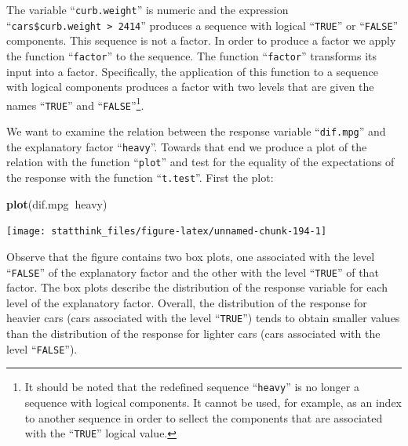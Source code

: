 \documentclass[]{krantz}
\makeatletter
\newenvironment{Shaded}{\begin{snugshade}}{\end{snugshade}}
\newcommand{\KeywordTok}[1]{\textcolor[rgb]{0.13,0.29,0.53}{\textbf{#1}}}
\newcommand{\DecValTok}[1]{\textcolor[rgb]{0.00,0.00,0.81}{#1}}
\newcommand{\StringTok}[1]{\textcolor[rgb]{0.31,0.60,0.02}{#1}}
\newcommand{\OperatorTok}[1]{\textcolor[rgb]{0.81,0.36,0.00}{\textbf{#1}}}
\newcommand{\NormalTok}[1]{#1}
\newenvironment{kframe}{%
\medskip{}
\setlength{\fboxsep}{.8em}
 \def\at@end@of@kframe{}%
 \ifinner\ifhmode%
  \def\at@end@of@kframe{\end{minipage}}%
  \begin{minipage}{\columnwidth}%
 \fi\fi%
 \def\FrameCommand##1{\hskip\@totalleftmargin \hskip-\fboxsep
 \colorbox{shadecolor}{##1}\hskip-\fboxsep
     \hskip-\linewidth \hskip-\@totalleftmargin \hskip\columnwidth}%
 \MakeFramed {\advance\hsize-\width
   \@totalleftmargin\z@ \linewidth\hsize
   \@setminipage}}%
 {\par\unskip\endMakeFramed%
 \at@end@of@kframe}
\renewenvironment{Shaded}{\begin{kframe}}{\end{kframe}}
\theoremstyle{definition}
\theoremstyle{definition}
\theoremstyle{definition}
\theoremstyle{remark}
\makeatother
\begin{document}
\begin{Shaded}
\end{Shaded}

The variable ``\texttt{curb.weight}'' is numeric and the expression
``\texttt{cars\$curb.weight\ \textgreater{}\ 2414}'' produces a sequence
with logical ``\texttt{TRUE}'' or ``\texttt{FALSE}'' components. This
sequence is not a factor. In order to produce a factor we apply the
function ``\texttt{factor}'' to the sequence. The function
``\texttt{factor}'' transforms its input into a factor. Specifically,
the application of this function to a sequence with logical components
produces a factor with two levels that are given the names
``\texttt{TRUE}'' and ``\texttt{FALSE}''\footnote{It should be noted
  that the redefined sequence ``\texttt{heavy}'' is no longer a sequence
  with logical components. It cannot be used, for example, as an index
  to another sequence in order to sellect the components that are
  associated with the ``\texttt{TRUE}'' logical value.}.

We want to examine the relation between the response variable
``\texttt{dif.mpg}'' and the explanatory factor ``\texttt{heavy}''.
Towards that end we produce a plot of the relation with the function
``\texttt{plot}'' and test for the equality of the expectations of the
response with the function ``\texttt{t.test}''. First the plot:

\begin{Shaded}
\begin{Highlighting}[]
\KeywordTok{plot}\NormalTok{(dif.mpg}\OperatorTok{~}\NormalTok{heavy)}
\end{Highlighting}
\end{Shaded}

\begin{center}\texttt{[image: statthink\_files/figure-latex/unnamed-chunk-194-1]} \end{center}

Observe that the figure contains two box plots, one associated with the
level ``\texttt{FALSE}'' of the explanatory factor and the other with
the level ``\texttt{TRUE}'' of that factor. The box plots describe the
distribution of the response variable for each level of the explanatory
factor. Overall, the distribution of the response for heavier cars (cars
associated with the level ``\texttt{TRUE}'') tends to obtain smaller
values than the distribution of the response for lighter cars (cars
associated with the level ``\texttt{FALSE}'').
\end{document}
